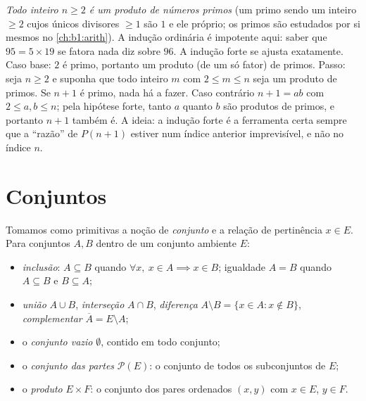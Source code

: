 \begin{example}\label{ex:b1:logic:strongind}
\emph{Todo inteiro $n \geq 2$ é um produto de números primos} (um primo
sendo um inteiro $\geq 2$ cujos únicos divisores $\geq 1$ são $1$ e ele
próprio; os primos são estudados por si mesmos no \cref{ch:b1:arith}).
A indução ordinária é impotente aqui: saber que $95 = 5 \times 19$
se fatora nada diz sobre $96$. A indução forte se ajusta exatamente. Caso
base: $2$ é primo, portanto um produto (de um só fator) de primos. Passo:
seja $n \geq 2$ e suponha que todo inteiro $m$ com $2 \leq m \leq n$ seja
um produto de primos. Se $n + 1$ é primo, nada há a fazer. Caso contrário
$n + 1 = ab$ com $2 \leq a, b \leq n$; pela hipótese forte, tanto $a$
quanto $b$ são produtos de primos, e portanto $n + 1$ também é. A ideia:
a indução forte é a ferramenta certa sempre que a ``razão'' de $P(n+1)$
estiver num índice anterior imprevisível, e não no índice $n$.
\end{example}

\section{Conjuntos}

\begin{definition}\label{def:b1:logic:sets}
Tomamos como primitivas a noção de \emph{conjunto} e a
relação de pertinência $x \in E$. Para conjuntos $A, B$ dentro de um
conjunto ambiente $E$:
\begin{itemize}
  \item \emph{inclusão}: $A \subseteq B$ quando $\forall x,\ x \in A
        \implies x \in B$; igualdade $A = B$ quando $A \subseteq B$ e
        $B \subseteq A$;
  \item \emph{união} $A \cup B$, \emph{interseção} $A \cap B$,
        \emph{diferença} $A \setminus B = \{x \in A : x \notin B\}$,
        \emph{complementar} $\overline{A} = E \setminus A$;
  \item o \emph{conjunto vazio} $\emptyset$, contido em todo conjunto;
  \item o \emph{conjunto das partes} $\mathcal{P}(E)$: o
        conjunto de todos os subconjuntos de $E$;
  \item o \emph{produto} $E \times F$: o conjunto dos pares ordenados
        $(x, y)$ com $x \in E$, $y \in F$.
\end{itemize}
\end{definition}

